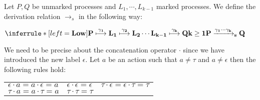 \begin{definition}
  Let $P, Q$ be unmarked processes and $L_{1}, \cdots, L_{k-1}$ marked processes. We define the derivation relation $\rightarrow_{s}$ in the following way:
  \begin{center}
    $\inferrule* [left=\bf{Low}]{
	P \stackrel{\gamma_{1}}{\longmapsto} L_{1} \stackrel{\gamma_{2}}{\longmapsto} L_{2} \cdots L_{k-1} \stackrel{\gamma_{k}}{\longmapsto} Q
      \\
	k\geq 1
    }{
      P \xrightarrow{\gamma_{1} \cdots \gamma_{k}}_{s}  Q
    }$
  \end{center}
  We need to be precise about the concatenation operator $\cdot$ since we have introduced the new label $\epsilon$. Let $a$ be an action such that $a\neq \tau$ and $a\neq \epsilon$ then the following rules hold:
  \begin{center}
      \begin{tabular}{lll}
	  $\epsilon \cdot a = a \cdot \epsilon = a$
	&
	  $\epsilon \cdot \epsilon = \epsilon$
	&
	  $\tau \cdot \epsilon = \epsilon \cdot \tau = \tau$
	\\
	  $\tau \cdot a = a \cdot \tau = a$
	&
	  $\tau \cdot \tau = \tau$
	&
      \end{tabular}
  \end{center}
\end{definition}


